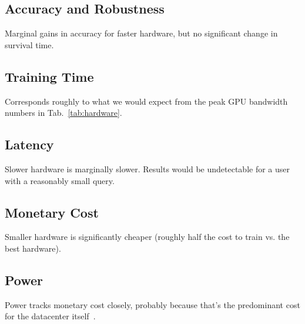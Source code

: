 \documentclass[conference]{IEEEtran}
\begin{document}
\subsection{Accuracy and Robustness}
Marginal gains in accuracy for faster hardware, but no significant change in survival time.
\subsection{Training Time}
Corresponds roughly to what we would expect from the peak GPU bandwidth numbers in Tab.~\ref{tab:hardware}.
\subsection{Latency}
Slower hardware is marginally slower. Results would be undetectable for a user with a reasonably small query.
\subsection{Monetary Cost}
Smaller hardware is significantly cheaper (roughly half the cost to train vs. the best hardware).
\subsection{Power}
Power tracks monetary cost closely, probably because that's the predominant cost for the datacenter itself~\cite{}.
\end{document}
